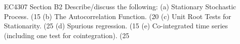 EC4307 Section B2
Describe/discuss the following:
(a)     Stationary Stochastic Process.                                                              (15%
(b)    The Autocorrelation Function.                                                               (20%
(c)     Unit Root Tests for Stationarity.                                                            (25%
(d)    Spurious regression.                                                                              (15%
(e)     Co-integrated time series (including one test for cointegration).               (25%

